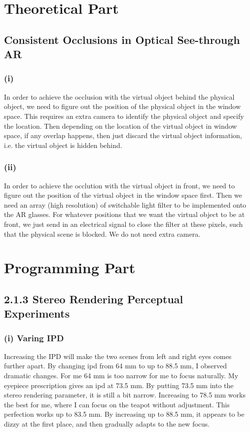\documentclass[11pt]{article}
\begin{document}
 


\section{Theoretical Part}
\subsection{Consistent Occlusions in Optical See-through AR}
\subsubsection*{(i)}
In order to achieve the occlusion with the virtual object behind the physical object, we need to figure out the position of the physical object in the window space. This requires an extra camera to identify the physical object and specify the location. Then depending on the location of the virtual object in window space, if any overlap happens, then just discard the virtual object information, i.e. the virtual object is hidden behind. 
\subsubsection*{(ii)}
In order to achieve the occlution with the virtual object in front, we need to figure out the position of the virtual object in the window space first. Then we need an array (high resolution) of switchable light filter to be implemented onto the AR glasses. For whatever positions that we want the virtual object to be at front, we just send in an electrical signal to close the filter at these pixels, such that the physical scene is blocked. We do not need extra camera. 

\newpage

\section*{Programming Part}
\subsection*{2.1.3 Stereo Rendering Perceptual Experiments}
\subsubsection*{(i) Varing IPD}
Increasing the IPD will make the two scenes from left and right eyes comes further apart. By changing ipd from 64 mm to up to 88.5 mm, I observed dramatic changes. For me 64 mm is too narrow for me to focus naturally. My eyepiece prescription gives an ipd at 73.5 mm. By putting 73.5 mm into the stereo rendering parameter, it is still a bit narrow. Increasing to 78.5 mm works the best for me, where I can focus on the teapot without adjustment. This perfection works up to 83.5 mm. By increasing up to 88.5 mm, it appears to be dizzy at the first place, and then gradually adapts to the new focus. 
\end{document}
